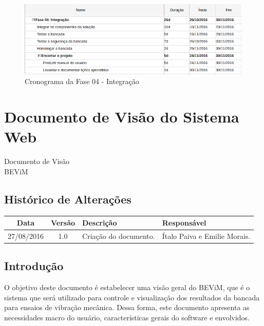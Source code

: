 \begin{apendicesenv}
\begin{figure}[!ht]
\centering
\includegraphics[scale=0.9]{figuras/cronograma_fase04.png}
\caption{Cronograma da Fase 04 - Integração}
\end{figure}


\chapter{Documento de Visão do Sistema Web}
% 	


\begin{center}
 {\large Documento de Visão}\\[0.2cm]
 {BEViM}\\
 \end{center}
 
 \section*{Histórico de Alterações}
\begin{table}[h]
\centering
\begin{tabular}{|c|c|p{6cm}|p{5cm}|}
\hline
Data & Versão & Descrição & Responsável\\
\hline                               
27/08/2016 & 1.0 & Criação do documento. & Ítalo Paiva e Emilie Morais.\\
\hline
\end{tabular}
\end{table}

\section*{Introdução}
	
    O objetivo deste documento é estabelecer uma visão geral do BEViM, que é o sistema que será utilizado para controle e visualização dos resultados da bancada para ensaios de vibração mecânica. Dessa forma, este documento apresenta as necessidades macro do usuário, características gerais do software e envolvidos.
    

\end{apendicesenv}
